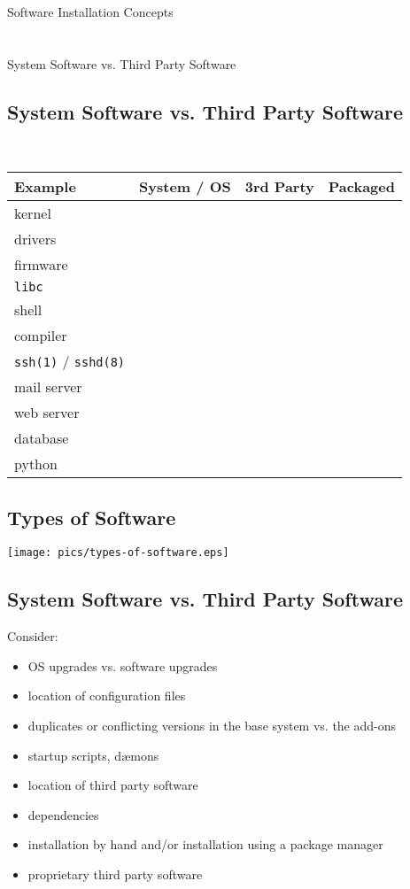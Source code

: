 \documentclass[xga]{xdvislides}
\begin{document}
\newpage
\vspace*{\fill}
\begin{center}
	\Hugesize
		Software Installation Concepts \\ [1em]
	\hspace*{5mm}
	\blueline\\
	\hspace*{5mm}\\
		System Software vs. Third Party Software
\end{center}
\vspace*{\fill}

\subsection{System Software vs. Third Party Software}
\\

\vspace{.5in}
\begin{tabularx}{\textwidth}{X | X | X | X }
{\bf Example} & {\bf System / OS} & {\bf 3rd Party} & {\bf Packaged} \\
\hline
kernel & & & \\
drivers & & & \\
firmware & & & \\
{\tt libc} & & & \\
shell & & & \\
compiler & & & \\
{\tt ssh(1)} / {\tt sshd(8)} & & & \\
mail server & & & \\
web server & & & \\
database & & & \\
python & & & \\
\end{tabularx}

\subsection{Types of Software}
\vfill
\begin{center}
	\texttt{[image: pics/types-of-software.eps]}
\end{center}
\vfill


\subsection{System Software vs. Third Party Software}
Consider:
\begin{itemize}
	\item OS upgrades vs. software upgrades
	\item location of configuration files
	\item duplicates or conflicting versions in the base system vs. the
		add-ons
	\item startup scripts, d{\ae}mons
	\item location of third party software
	\item dependencies
	\item installation by hand and/or installation using a package manager
	\item proprietary third party software
\end{itemize}
\end{document}
